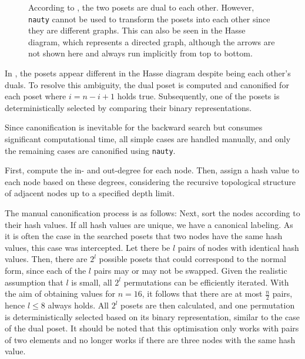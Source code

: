 \documentclass[a4paper,UKenglish,cleveref, autoref, thm-restate]{lipics-v2021}
\begin{document}
\begin{figure}[!b]
  \centering
  
  \caption{According to , the two posets are dual to each other.
    However, \texttt{nauty} cannot be used to transform the posets into each other since they are different graphs.
    This can also be seen in the Hasse diagram, which represents a directed graph, although the arrows are not shown here and always run implicitly from top to bottom.}
  \label{fig:backward_canonify_problematic}
\end{figure}

In , the posets appear different in the Hasse diagram despite being each other's duals.
To resolve this ambiguity, the dual poset is computed and canonified for each poset where $i = n - i + 1$ holds true.
Subsequently, one of the posets is deterministically selected by comparing their binary representations.

Since canonification is inevitable for the backward search but consumes significant computational time, all simple cases are handled manually, and only the remaining cases are canonified using \texttt{nauty}.

First, compute the in- and out-degree for each node.
Then, assign a hash value to each node based on these degrees, considering the recursive topological structure of adjacent nodes up to a specified depth limit.

The manual canonification process is as follows:
Next, sort the nodes according to their hash values.
If all hash values are unique, we have a canonical labeling.
As it is often the case in the searched posets that two nodes have the same hash values, this case was intercepted.
Let there be $l$ pairs of nodes with identical hash values.
Then, there are $2^l$ possible posets that could correspond to the normal form, since each of the $l$ pairs may or may not be swapped.
Given the realistic assumption that $l$ is small, all $2^l$ permutations can be efficiently iterated.
With the aim of obtaining values for $n = 16$, it follows that there are at most $\frac{n}{2}$ pairs, hence $l \leq 8$ always holds.
All $2^l$ posets are then calculated, and one permutation is deterministically selected based on its binary representation, similar to the case of the dual poset.
It should be noted that this optimisation only works with pairs of two elements and no longer works if there are three nodes with the same hash value.
\end{document}
